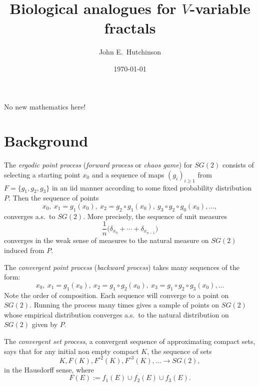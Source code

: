 \documentclass[11pt]{amsart}
\begin{document}
 
 \title{Biological analogues for $ V $-variable fractals}  
\author{John E.\ Hutchinson}
\date{\today}
 
 
 \maketitle
 
 No new mathematics here!
 
\bigskip  

% 
% 


\section{Background}
The \emph{ergodic point process} (\emph{forward process} or \emph{chaos game}) for $ SG(2) $  consists of selecting a starting point $ x_0 $ and a sequence of maps $ (g_i)_{i\geq 1} $ from $ F=\{g_1,g_2,g_3  \} $ in an iid manner according to some fixed probability distribution $ P $.  Then the sequence of points
\[
x_0,\  x_1=g_1(x_0),\  x_2 = g_2\circ g_1(x_0), \  g_3\circ g_2 \circ g_0 (x_0),                   \dots ,
\]
converges a.s.\  to $  SG(2) $.       
More precisely, the sequence of unit measures
\[
\frac{1}{n} \big(\delta_{x_0}+\cdots + \delta_{x_{n-1}}\big)
\]
converges in the weak sense of measures to the natural measure on $ SG(2) $ induced from $ P $.

\bigskip
The \emph{convergent point process} (\emph{backward process}) takes many sequences of the form:
\[
x_0,  \  x_1 = g_1(x_0),\  x_2 = g_1\circ g_2(x_0),\  x_3 = g_1\circ g_2 \circ g_3 (x_0), \dots 
\]
Note the order of composition.  Each sequence will converge to a point on $ SG(2) $.  Running the process many times gives a sample of points on $ SG(2) $ whose empirical distribution converges a.s.\ to the natural distribution on $ SG(2) $ given by $ P $.


\bigskip
The \emph{convergent set process}, a convergent sequence of approximating compact sets, says that for any initial non empty compact $ K $, the sequence of sets
\[
K, F(K), F^{\circ 2}(K), F^{\circ 3}(K), \dots \to SG(2),\]
in the Hausdorff  sense, where 
\[ F(E) := f_1(E) \cup f_2(E) \cup f_3(E). \]






\end{document}
